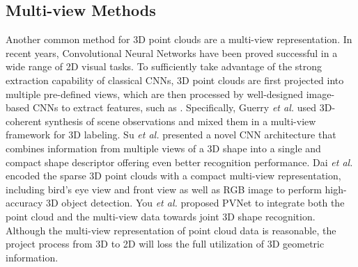 \documentclass{cta-author}
\begin{document}
\subsection{Multi-view Methods}
Another common method for 3D point clouds are a multi-view representation. In recent years, Convolutional Neural Networks have been proved successful in a wide range of 2D visual tasks. To sufficiently take advantage of the strong extraction capability of classical CNNs, 3D point clouds are first projected into multiple pre-defined views, which are then processed by well-designed image-based CNNs to extract features, such as \cite{su2015multi,shi2015deeppano,roveri2018network,you2018pvnet,dai20183dmv,guerry2017snapnet,qi2016volumetric}. Specifically, Guerry \emph{et al.} \cite{guerry2017snapnet} used 3D-coherent synthesis of scene observations and mixed them in a multi-view framework for 3D labeling. Su \emph{et al.} \cite{su2015multi} presented a novel CNN architecture that combines information from multiple views of a 3D shape into a single and compact shape descriptor offering even better recognition performance. Dai \emph{et al.} \cite{dai20183dmv} encoded the sparse 3D point clouds with a compact multi-view representation, including bird’s eye view and front view as well as RGB image to perform high-accuracy 3D object detection. You \emph{et al.} \cite{you2018pvnet} proposed PVNet to integrate both the point cloud and the multi-view data towards joint 3D shape recognition.
Although the multi-view representation of point cloud data is reasonable, the project process from 3D to 2D will loss the full utilization of  3D geometric information.
\end{document}
